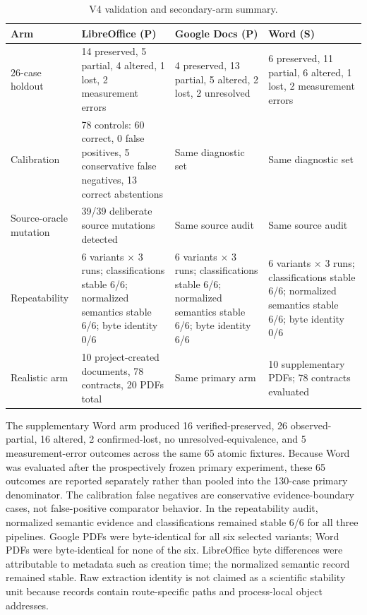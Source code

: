 \begin{table}[t]
\centering\footnotesize
\caption{V4 validation and secondary-arm summary.}
\label{tab:checks}
\begin{tabular}{p{}p{}p{}p{}}
\toprule
Arm & LibreOffice (P) & Google Docs (P) & Word (S) \\
\midrule
26-case holdout & 14 preserved, 5 partial, 4 altered, 1 lost, 2 measurement errors & 4 preserved, 13 partial, 5 altered, 2 lost, 2 unresolved & 6 preserved, 11 partial, 6 altered, 1 lost, 2 measurement errors \\
Calibration & 78 controls: 60 correct, 0 false positives, 5 conservative false negatives, 13 correct abstentions & Same diagnostic set & Same diagnostic set \\
Source-oracle mutation & 39/39 deliberate source mutations detected & Same source audit & Same source audit \\
Repeatability & 6 variants $\times$ 3 runs; classifications stable 6/6; normalized semantics stable 6/6; byte identity 0/6 & 6 variants $\times$ 3 runs; classifications stable 6/6; normalized semantics stable 6/6; byte identity 6/6 & 6 variants $\times$ 3 runs; classifications stable 6/6; normalized semantics stable 6/6; byte identity 0/6 \\
Realistic arm & 10 project-created documents, 78 contracts, 20 PDFs total & Same primary arm & 10 supplementary PDFs; 78 contracts evaluated \\
\bottomrule
\end{tabular}
\end{table}

The supplementary Word arm produced 16 verified-preserved, 26 observed-partial, 16 altered, 2 confirmed-lost, no unresolved-equivalence, and 5 measurement-error outcomes across the same 65 atomic fixtures. Because Word was evaluated after the prospectively frozen primary experiment, these 65 outcomes are reported separately rather than pooled into the 130-case primary denominator. The calibration false negatives are conservative evidence-boundary cases, not false-positive comparator behavior. In the repeatability audit, normalized semantic evidence and classifications remained stable 6/6 for all three pipelines. Google PDFs were byte-identical for all six selected variants; Word PDFs were byte-identical for none of the six. LibreOffice byte differences were attributable to metadata such as creation time; the normalized semantic record remained stable. Raw extraction identity is not claimed as a scientific stability unit because records contain route-specific paths and process-local object addresses.

